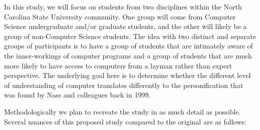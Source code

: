 \documentclass[english]{article}
\begin{document}
\begin{comment}
Clifford Nass' 1999 study on human computer interaction looked to determine whether humans treated computers with politeness or not\cite{nass1999}.  The study looked at Stanford University students, since the assumption was that such students had access and familiarity with computers and would be assumed to not treat computers in this way.  Surprisingly Nass' results proved that in fact the students did treat machines with the same sort of politeness what would be accorded to humans.

In the intervening 16 years the sheer number of people with computer access at home in the US has increased by a significant degree.  Census reports indicate around 51\% of households had a computer at home in 1999\cite{newburger2001}, while that percentage had increased to 83\% by 2013 \cite{file2014}.

Further, smart-phones have become completely ubiquitous over the same time period, the census bureau indicates that 63\% of households had a "handheld computer"(smart-phone, or other wireless computer)\cite{file2014}. It seems fair to conclude that a replication of Nass', study in light of the changing relationship that humans have with computers, is a worthwhile endeavour.
\end{comment}

In this study, we will focus on students from two disciplines within the North Carolina State University community. One group will come from Computer Science undergraduate and/or graduate students, and the other will likely be a group of non-Computer Science students. The idea with two distinct and separate groups of participants is to have a group of students that are intimately aware of the inner-workings of computer programs and a group of students that are much more likely to have access to computers from a layman rather than expert perspective. The underlying goal here is to determine whether the different level of understanding of computer translates differently to the personification that was found by Nass and colleagues back in 1999.

Methodologically we plan to recreate the study in as much detail as possible. Several nuances of this proposed study compared to the original are as follows:
\end{document}
